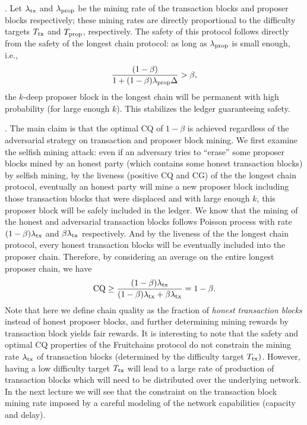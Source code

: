 \documentclass{article}
\begin{document}
. Let $\lambda_{\rm tx}$ and $\lambda_{\rm prop}$ be the mining rate of the transaction blocks and proposer blocks respectively; these mining rates are directly proportional to the difficulty targets $T_{\rm tx}$ and $T_{\rm prop}$, respectively. The safety of this protocol  follows directly from the safety of the longest chain protocol: as long as $\lambda_{\rm prop}$ is small enough, i.e., 
$$\frac{(1-\beta)}{1+(1-\beta)\lambda_{\rm prop}\Delta} > \beta,$$
the $k$-deep proposer block in the longest chain will be permanent with high probability (for large enough $k$). This stabilizes the ledger guaranteeing safety. 

. The main claim is that the optimal CQ of $1-\beta$ is achieved  regardless of the adversarial strategy on transaction and proposer block mining. We first examine the selfish mining attack: even if an adversary tries to ``erase'' some proposer blocks mined by an honest party (which contains some honest transaction blocks) by selfish mining, by the liveness (positive CQ and CG) of the the longest chain protocol, eventually an honest party will mine a new proposer block including those transaction blocks that were displaced and with large enough $k$, this proposer block will be safely included in the ledger. We know that the mining of the honest and adversarial transaction blocks follows Poisson process with rate $(1-\beta)\lambda_{\rm tx}$ and $\beta \lambda_{\rm tx}$ respectively. And by the liveness of the the longest chain protocol, every honest transaction blocks will be eventually included into the proposer chain. Therefore, by considering an average on the entire longest proposer chain, we have 
$$ {\rm CQ} \geq \frac{(1-\beta)\lambda_{\rm tx}}{(1-\beta)\lambda_{\rm tx} +\beta\lambda_{\rm tx}} = 1-\beta.$$
Note that here we define chain quality as the fraction of {\em honest transaction blocks}  instead of honest proposer blocks, and further determining mining rewards by transaction block yields fair rewards. It is interesting to note that the safety and optimal CQ properties of the Fruitchains protocol do not constrain the mining rate $\lambda_{\rm tx}$ of transaction blocks (determined by the difficulty target $T_{\rm tx})$. However, having a low difficulty target $T_{\rm tx}$ will lead to a large rate of production of transaction blocks which will need to be distributed over the underlying network. In the next lecture we will see that the constraint on the transaction block mining rate imposed by a careful modeling of the network capabilities (capacity and delay). 
\end{document}
